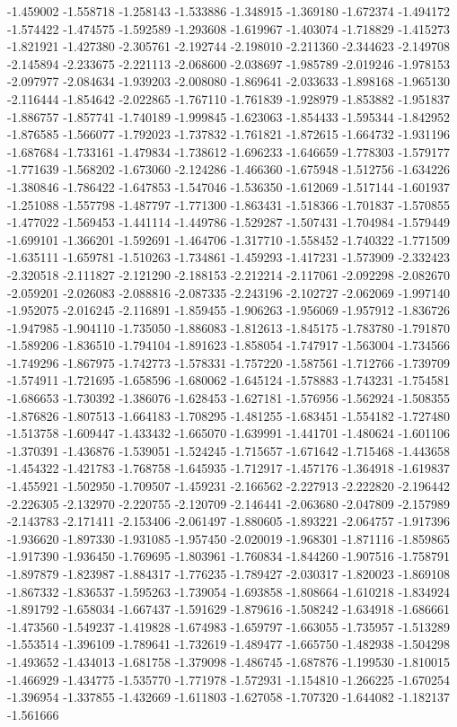 -1.459002
-1.558718
-1.258143
-1.533886
-1.348915
-1.369180
-1.672374
-1.494172
-1.574422
-1.474575
-1.592589
-1.293608
-1.619967
-1.403074
-1.718829
-1.415273
-1.821921
-1.427380
-2.305761
-2.192744
-2.198010
-2.211360
-2.344623
-2.149708
-2.145894
-2.233675
-2.221113
-2.068600
-2.038697
-1.985789
-2.019246
-1.978153
-2.097977
-2.084634
-1.939203
-2.008080
-1.869641
-2.033633
-1.898168
-1.965130
-2.116444
-1.854642
-2.022865
-1.767110
-1.761839
-1.928979
-1.853882
-1.951837
-1.886757
-1.857741
-1.740189
-1.999845
-1.623063
-1.854433
-1.595344
-1.842952
-1.876585
-1.566077
-1.792023
-1.737832
-1.761821
-1.872615
-1.664732
-1.931196
-1.687684
-1.733161
-1.479834
-1.738612
-1.696233
-1.646659
-1.778303
-1.579177
-1.771639
-1.568202
-1.673060
-2.124286
-1.466360
-1.675948
-1.512756
-1.634226
-1.380846
-1.786422
-1.647853
-1.547046
-1.536350
-1.612069
-1.517144
-1.601937
-1.251088
-1.557798
-1.487797
-1.771300
-1.863431
-1.518366
-1.701837
-1.570855
-1.477022
-1.569453
-1.441114
-1.449786
-1.529287
-1.507431
-1.704984
-1.579449
-1.699101
-1.366201
-1.592691
-1.464706
-1.317710
-1.558452
-1.740322
-1.771509
-1.635111
-1.659781
-1.510263
-1.734861
-1.459293
-1.417231
-1.573909
-2.332423
-2.320518
-2.111827
-2.121290
-2.188153
-2.212214
-2.117061
-2.092298
-2.082670
-2.059201
-2.026083
-2.088816
-2.087335
-2.243196
-2.102727
-2.062069
-1.997140
-1.952075
-2.016245
-2.116891
-1.859455
-1.906263
-1.956069
-1.957912
-1.836726
-1.947985
-1.904110
-1.735050
-1.886083
-1.812613
-1.845175
-1.783780
-1.791870
-1.589206
-1.836510
-1.794104
-1.891623
-1.858054
-1.747917
-1.563004
-1.734566
-1.749296
-1.867975
-1.742773
-1.578331
-1.757220
-1.587561
-1.712766
-1.739709
-1.574911
-1.721695
-1.658596
-1.680062
-1.645124
-1.578883
-1.743231
-1.754581
-1.686653
-1.730392
-1.386076
-1.628453
-1.627181
-1.576956
-1.562924
-1.508355
-1.876826
-1.807513
-1.664183
-1.708295
-1.481255
-1.683451
-1.554182
-1.727480
-1.513758
-1.609447
-1.433432
-1.665070
-1.639991
-1.441701
-1.480624
-1.601106
-1.370391
-1.436876
-1.539051
-1.524245
-1.715657
-1.671642
-1.715468
-1.443658
-1.454322
-1.421783
-1.768758
-1.645935
-1.712917
-1.457176
-1.364918
-1.619837
-1.455921
-1.502950
-1.709507
-1.459231
-2.166562
-2.227913
-2.222820
-2.196442
-2.226305
-2.132970
-2.220755
-2.120709
-2.146441
-2.063680
-2.047809
-2.157989
-2.143783
-2.171411
-2.153406
-2.061497
-1.880605
-1.893221
-2.064757
-1.917396
-1.936620
-1.897330
-1.931085
-1.957450
-2.020019
-1.968301
-1.871116
-1.859865
-1.917390
-1.936450
-1.769695
-1.803961
-1.760834
-1.844260
-1.907516
-1.758791
-1.897879
-1.823987
-1.884317
-1.776235
-1.789427
-2.030317
-1.820023
-1.869108
-1.867332
-1.836537
-1.595263
-1.739054
-1.693858
-1.808664
-1.610218
-1.834924
-1.891792
-1.658034
-1.667437
-1.591629
-1.879616
-1.508242
-1.634918
-1.686661
-1.473560
-1.549237
-1.419828
-1.674983
-1.659797
-1.663055
-1.735957
-1.513289
-1.553514
-1.396109
-1.789641
-1.732619
-1.489477
-1.665750
-1.482938
-1.504298
-1.493652
-1.434013
-1.681758
-1.379098
-1.486745
-1.687876
-1.199530
-1.810015
-1.466929
-1.434775
-1.535770
-1.771978
-1.572931
-1.154810
-1.266225
-1.670254
-1.396954
-1.337855
-1.432669
-1.611803
-1.627058
-1.707320
-1.644082
-1.182137
-1.561666
